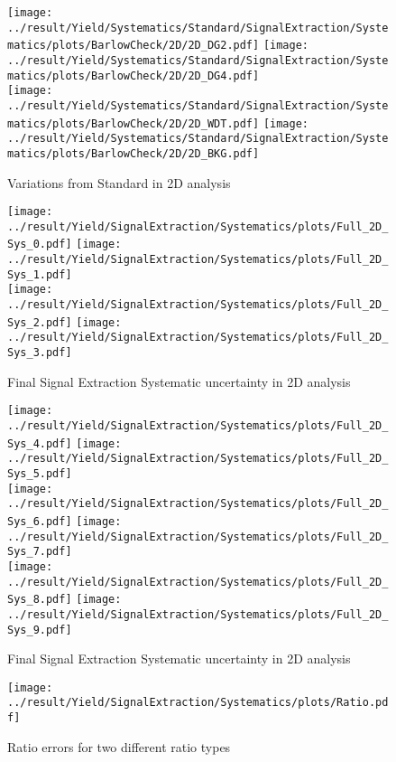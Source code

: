 \newpage
\begin{figure}
	\centering
		\texttt{[image: ../result/Yield/Systematics/Standard/SignalExtraction/Systematics/plots/BarlowCheck/2D/2D\_DG2.pdf]}
		\texttt{[image: ../result/Yield/Systematics/Standard/SignalExtraction/Systematics/plots/BarlowCheck/2D/2D\_DG4.pdf]}\\
		\texttt{[image: ../result/Yield/Systematics/Standard/SignalExtraction/Systematics/plots/BarlowCheck/2D/2D\_WDT.pdf]}
		\texttt{[image: ../result/Yield/Systematics/Standard/SignalExtraction/Systematics/plots/BarlowCheck/2D/2D\_BKG.pdf]}
		\caption{Variations from Standard in 2D analysis}
		\label{}
\end{figure}

\begin{figure}
	\centering
		\texttt{[image: ../result/Yield/SignalExtraction/Systematics/plots/Full\_2D\_Sys\_0.pdf]}
		\texttt{[image: ../result/Yield/SignalExtraction/Systematics/plots/Full\_2D\_Sys\_1.pdf]}\\
		\texttt{[image: ../result/Yield/SignalExtraction/Systematics/plots/Full\_2D\_Sys\_2.pdf]}
		\texttt{[image: ../result/Yield/SignalExtraction/Systematics/plots/Full\_2D\_Sys\_3.pdf]}
		\caption{Final Signal Extraction Systematic uncertainty in 2D analysis}
		\label{}
\end{figure}

\newpage
\begin{figure}
	\centering
		\texttt{[image: ../result/Yield/SignalExtraction/Systematics/plots/Full\_2D\_Sys\_4.pdf]}
		\texttt{[image: ../result/Yield/SignalExtraction/Systematics/plots/Full\_2D\_Sys\_5.pdf]}\\
		\texttt{[image: ../result/Yield/SignalExtraction/Systematics/plots/Full\_2D\_Sys\_6.pdf]}
		\texttt{[image: ../result/Yield/SignalExtraction/Systematics/plots/Full\_2D\_Sys\_7.pdf]}\\
		\texttt{[image: ../result/Yield/SignalExtraction/Systematics/plots/Full\_2D\_Sys\_8.pdf]}
		\texttt{[image: ../result/Yield/SignalExtraction/Systematics/plots/Full\_2D\_Sys\_9.pdf]}
		\caption{Final Signal Extraction Systematic uncertainty in 2D analysis}
		\label{}
\end{figure}

\newpage
\begin{figure}
	\centering
		\texttt{[image: ../result/Yield/SignalExtraction/Systematics/plots/Ratio.pdf]}
		\caption{Ratio errors for two different ratio types}
		\label{}
\end{figure}

